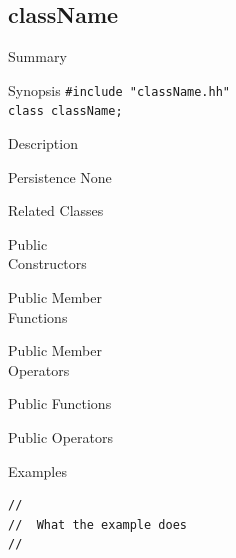 \subsection{className}
\label{sec:className}
\begin{Entry}
\item[Summary]

\item[Synopsis]
    \verb+#include "className.hh"+\\
    \verb+class className;+\\

\item[Description]

\item[Persistence]
    None

\item[Related Classes]

\item[Public\\ Constructors]

\item[Public Member\\ Functions]

\item[Public Member\\ Operators]

\item[Public Functions]

\item[Public Operators]

\item[Examples]
{\footnotesize
\begin{verbatim}
//
//  What the example does
//

\end{verbatim}
}%

\end{Entry}
